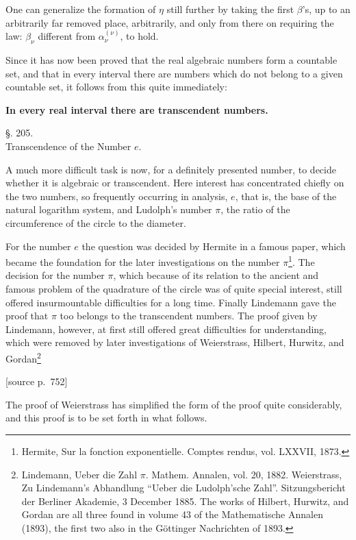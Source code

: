 \documentclass[11pt]{article}
\newcommand{\srcpage}[1]{\par\medskip\noindent\textsf{[source p.~#1]}\par\smallskip}
\begin{document}
One can generalize the formation of $\eta$ still further by taking the first $\beta$'s, up to an arbitrarily far removed place, arbitrarily, and only from there on requiring the law: $\beta_\nu$ different from $\alpha_\nu^{(\nu)}$, to hold.

Since it has now been proved that the real algebraic numbers form a countable set, and that in every interval there are numbers which do not belong to a given countable set, it follows from this quite immediately:

\begin{center}
\textbf{In every real interval there are transcendent numbers.}
\end{center}

\begin{center}
{\large §. 205.}\\[0.4em]
{\large Transcendence of the Number $e$.}
\end{center}

A much more difficult task is now, for a definitely presented number, to decide whether it is algebraic or transcendent. Here interest has concentrated chiefly on the two numbers, so frequently occurring in analysis, $e$, that is, the base of the natural logarithm system, and Ludolph's number $\pi$, the ratio of the circumference of the circle to the diameter.

For the number $e$ the question was decided by Hermite in a famous paper, which became the foundation for the later investigations on the number $\pi$\footnote{Hermite, Sur la fonction exponentielle. Comptes rendus, vol. LXXVII, 1873.}. The decision for the number $\pi$, which because of its relation to the ancient and famous problem of the quadrature of the circle was of quite special interest, still offered insurmountable difficulties for a long time. Finally Lindemann gave the proof that $\pi$ too belongs to the transcendent numbers. The proof given by Lindemann, however, at first still offered great difficulties for understanding, which were removed by later investigations of Weierstrass, Hilbert, Hurwitz, and Gordan\footnote{Lindemann, Ueber die Zahl $\pi$. Mathem. Annalen, vol. 20, 1882. Weierstrass, Zu Lindemann's Abhandlung ``Ueber die Ludolph'sche Zahl''. Sitzungsbericht der Berliner Akademie, 3 December 1885. The works of Hilbert, Hurwitz, and Gordan are all three found in volume 43 of the Mathematische Annalen (1893), the first two also in the Göttinger Nachrichten of 1893.}
\srcpage{752}
The proof of Weierstrass has simplified the form of the proof quite considerably, and this proof is to be set forth in what follows.
\end{document}
